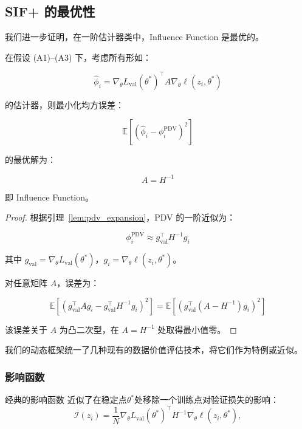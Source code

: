 \subsection{SIF+ 的最优性}
\label{sec:sif_optimal}

我们进一步证明，在一阶估计器类中，Influence Function 是最优的。

\begin{theorem}[一阶最优性]
\label{thm:sif_optimal}

在假设 (A1)--(A3) 下，考虑所有形如：

\begin{equation}
\hat{\phi}_i = \nabla_\theta L_{\mathrm{val}}(\theta^*)^\top A \nabla_\theta \ell(z_i, \theta^*)
\label{eq:estimator_class}
\end{equation}

的估计器，则最小化均方误差：

\[
\mathbb{E}[(\hat{\phi}_i - \phi_i^{\mathrm{PDV}})^2]
\]

的最优解为：

\begin{equation}
A = H^{-1}
\label{eq:optimal_A}
\end{equation}

即 Influence Function。
\end{theorem}

\begin{proof}
根据引理~\ref{lem:pdv_expansion}，PDV 的一阶近似为：

\[
\phi_i^{\mathrm{PDV}} \approx g_{\mathrm{val}}^\top H^{-1} g_i
\]

其中 \(g_{\mathrm{val}} = \nabla_\theta L_{\mathrm{val}}(\theta^*)\)，\(g_i = \nabla_\theta \ell(z_i, \theta^*)\)。

对任意矩阵 \(A\)，误差为：

\[
\mathbb{E}[(g_{\mathrm{val}}^\top A g_i - g_{\mathrm{val}}^\top H^{-1} g_i)^2] = \mathbb{E}[(g_{\mathrm{val}}^\top (A - H^{-1}) g_i)^2]
\]

该误差关于 \(A\) 为凸二次型，在 \(A = H^{-1}\) 处取得最小值零。
\end{proof}

我们的动态框架统一了几种现有的数据价值评估技术，将它们作为特例或近似。

\subsubsection{影响函数}
经典的影响函数 \cite{influence} 近似了在稳定点\(\theta^*\)处移除一个训练点对验证损失的影响：
\[
\mathcal{I}(z_i) = \frac{1}{N} \nabla_{\theta} L_{\text{val}}(\theta^*)^{\top} H^{-1} \nabla_{\theta} \ell(z_i, \theta^*),
\]

